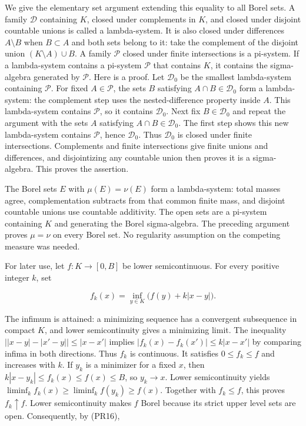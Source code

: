 \documentclass[
  11pt,
]{article}
\begin{document}
We give the elementary set argument extending this equality to all Borel
sets. A family \(\mathcal D\) containing \(K\), closed under complements
in \(K\), and closed under disjoint countable unions is called a
lambda-system. It is also closed under differences \(A\setminus B\) when
\(B\subset A\) and both sets belong to it: take the complement of the
disjoint union \((K\setminus A)\cup B\). A family \(\mathcal P\) closed
under finite intersections is a pi-system. If a lambda-system contains a
pi-system \(\mathcal P\) that contains \(K\), it contains the
sigma-algebra generated by \(\mathcal P\). Here is a proof. Let
\(\mathcal D_0\) be the smallest lambda-system containing
\(\mathcal P\). For fixed \(A\in\mathcal P\), the sets \(B\) satisfying
\(A\cap B\in\mathcal D_0\) form a lambda-system: the complement step
uses the nested-difference property inside \(A\). This lambda-system
contains \(\mathcal P\), so it contains \(\mathcal D_0\). Next fix
\(B\in\mathcal D_0\) and repeat the argument with the sets \(A\)
satisfying \(A\cap B\in\mathcal D_0\). The first step shows this new
lambda-system contains \(\mathcal P\), hence \(\mathcal D_0\). Thus
\(\mathcal D_0\) is closed under finite intersections. Complements and
finite intersections give finite unions and differences, and
disjointizing any countable union then proves it is a sigma-algebra.
This proves the assertion.

The Borel sets \(E\) with \(\mu(E)=\nu(E)\) form a lambda-system: total
masses agree, complementation subtracts from that common finite mass,
and disjoint countable unions use countable additivity. The open sets
are a pi-system containing \(K\) and generating the Borel sigma-algebra.
The preceding argument proves \(\mu=\nu\) on every Borel set. No
regularity assumption on the competing measure was needed.

For later use, let \(f:K\to[0,B]\) be lower semicontinuous. For every
positive integer \(k\), set

\[
f_k(x)=\inf_{y\in K}\bigl(f(y)+k|x-y|\bigr).
\tag{PR22}
\]

The infimum is attained: a minimizing sequence has a convergent
subsequence in compact \(K\), and lower semicontinuity gives a
minimizing limit. The inequality \(\big||x-y|-|x'-y|\big|\leq|x-x'|\)
implies \(|f_k(x)-f_k(x')|\leq k|x-x'|\) by comparing infima in both
directions. Thus \(f_k\) is continuous. It satisfies \(0\leq f_k\leq f\)
and increases with \(k\). If \(y_k\) is a minimizer for a fixed \(x\),
then \(k|x-y_k|\leq f_k(x)\leq f(x)\leq B\), so \(y_k\to x\). Lower
semicontinuity yields \(\liminf_k f_k(x)\geq\liminf_k f(y_k)\geq f(x)\).
Together with \(f_k\leq f\), this proves \(f_k\uparrow f\). Lower
semicontinuity makes \(f\) Borel because its strict upper level sets are
open. Consequently, by (PR16),
\end{document}

